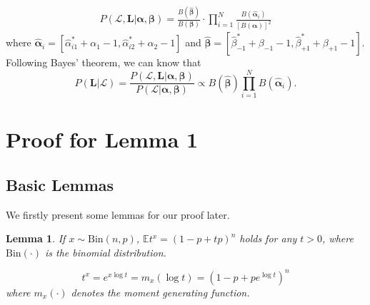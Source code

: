 \documentclass{article}
\makeatletter
\newcounter{lemmas}
\newtheorem{lemma}[lemmas]{Lemma}
\renewenvironment{proof}[1][\proofname]{\par
  \vspace{-\topsep}%
  \pushQED{\qed}%
  \normalfont
  \topsep0pt \partopsep0pt %
  \trivlist
  \item[\hskip\labelsep
        \itshape
    #1\@addpunct{.}]\ignorespaces
}{%
  \popQED\endtrivlist\@endpefalse
  \addvspace{0pt plus 0pt} %
}
\makeatother
\begin{document}
\begin{equation}
\label{marginalization}
\begin{split}
P(\mathcal{L},\bm{L}|\bm{\alpha}, \bm{\beta})=\frac{B(\hat{\bm{\beta}})}{B(\bm{\beta})}\cdot {\prod}_{i=1}^{N}\frac{B(\hat{\bm{\alpha}}_{i})}{[B(\bm{\alpha})]^2}
\end{split}
\end{equation}
where $\hat{\bm{\alpha}}_i=[\hat{\alpha}^{*}_{i1}+\alpha_1-1,\hat{\alpha}^{*}_{i2}+\alpha_2-1]$ and $\hat{\bm{\beta}}=[\hat{\beta}^{*}_{-1}+\beta_{-1}-1,\hat{\beta}^{*}_{+1}+\beta_{+1}-1]$. Following Bayes' theorem, we can know that
\begin{equation}
\label{PostDist}
P(\bm{L}|\mathcal{L})=\frac{P(\mathcal{L},\bm{L}|\bm{\alpha}, \bm{\beta})}{P(\mathcal{L}|\bm{\alpha}, \bm{\beta})}\propto B(\hat{\bm{\beta}})\prod_{i=1}^{N}B(\hat{\bm{\alpha}}_{i}). 
\end{equation}
\section{Proof for Lemma 1}
\subsection{Basic Lemmas}
We firstly present some lemmas for our proof later.
\begin{lemma}
\label{MoGene}
If $x\sim \mathrm{Bin}(n,p)$, $\mathbb{E}t^x= \left(1-p+tp\right)^{n}$ holds for any $t>0$, where $\mathrm{Bin}(\cdot)$ is the binomial distribution.
\begin{proof}
\begin{equation}
t^x = e^{x\log t}=m_x(\log t)= \left(1-p+pe^{\log t}\right)^{n}
\end{equation}
where $m_x(\cdot)$ denotes the moment generating function.
\end{proof}
\end{lemma}
\end{document}
